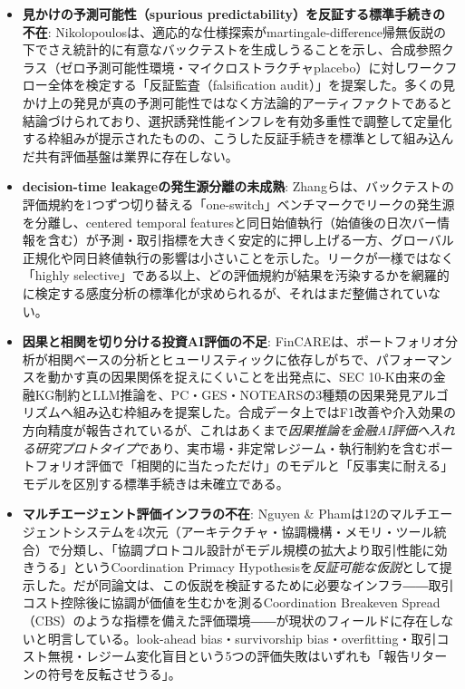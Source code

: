 \begin{itemize}
  \item \textbf{見かけの予測可能性（spurious predictability）を反証する標準手続きの不在}: Nikolopoulos\cite{x07spurious2026}は、適応的な仕様探索がmartingale-difference帰無仮説の下でさえ統計的に有意なバックテストを生成しうることを示し、合成参照クラス（ゼロ予測可能性環境・マイクロストラクチャplacebo）に対しワークフロー全体を検定する「反証監査（falsification audit）」を提案した。多くの見かけ上の発見が真の予測可能性ではなく方法論的アーティファクトであると結論づけられており、選択誘発性能インフレを有効多重性で調整して定量化する枠組みが提示されたものの、こうした反証手続きを標準として組み込んだ共有評価基盤は業界に存在しない。
  \item \textbf{decision-time leakageの発生源分離の未成熟}: Zhangら\cite{x07alphadisappears2026}は、バックテストの評価規約を1つずつ切り替える「one-switch」ベンチマークでリークの発生源を分離し、centered temporal featuresと同日始値執行（始値後の日次バー情報を含む）が予測・取引指標を大きく安定的に押し上げる一方、グローバル正規化や同日終値執行の影響は小さいことを示した。リークが一様ではなく「highly selective」である以上、どの評価規約が結果を汚染するかを網羅的に検定する感度分析の標準化が求められるが、それはまだ整備されていない。
  \item \textbf{因果と相関を切り分ける投資AI評価の不足}: FinCARE\cite{x07fincare2025}は、ポートフォリオ分析が相関ベースの分析とヒューリスティックに依存しがちで、パフォーマンスを動かす真の因果関係を捉えにくいことを出発点に、SEC 10-K由来の金融KG制約とLLM推論を、PC・GES・NOTEARSの3種類の因果発見アルゴリズムへ組み込む枠組みを提案した。合成データ上ではF1改善や介入効果の方向精度が報告されているが、これはあくまで\emph{因果推論を金融AI評価へ入れる研究プロトタイプ}であり、実市場・非定常レジーム・執行制約を含むポートフォリオ評価で「相関的に当たっただけ」のモデルと「反事実に耐える」モデルを区別する標準手続きは未確立である。
  \item \textbf{マルチエージェント評価インフラの不在}: Nguyen \& Pham\cite{x07finmaseval2026}は12のマルチエージェントシステムを4次元（アーキテクチャ・協調機構・メモリ・ツール統合）で分類し、「協調プロトコル設計がモデル規模の拡大より取引性能に効きうる」というCoordination Primacy Hypothesisを\emph{反証可能な仮説}として提示した。だが同論文は、この仮説を検証するために必要なインフラ――取引コスト控除後に協調が価値を生むかを測るCoordination Breakeven Spread（CBS）のような指標を備えた評価環境――が現状のフィールドに存在しないと明言している。look-ahead bias・survivorship bias・overfitting・取引コスト無視・レジーム変化盲目という5つの評価失敗はいずれも「報告リターンの符号を反転させうる」。

\end{itemize}

